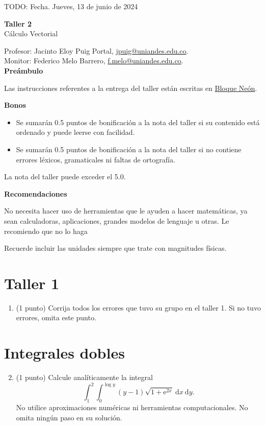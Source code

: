 \documentclass{fmbvecto}
\renewcommand{\title}{Taller 2}
\newcommand{\subject}{Cálculo Vectorial}
\begin{document}
TODO: Fecha. Jueves, 13 de junio de 2024

\begin{center}
    \textbf{\LARGE \title} \\
    {\large \subject}
\end{center}


Profesor: Jacinto Eloy Puig Portal, \href{mailto:jpuig@uniandes.edu.co}{jpuig@uniandes.edu.co}. \\
Monitor: Federico Melo Barrero, \href{mailto:f.melo@uniandes.edu.co}{f.melo@uniandes.edu.co}.\\

\textbf{\Large Preámbulo}

Las instrucciones referentes a la entrega del taller están escritas en \href{https://bloqueneon.uniandes.edu.co/d2l/home}{Bloque Neón}.

\textbf{Bonos}
\begin{itemize}
  \item Se sumarán 0.5 puntos de bonificación a la nota del taller si su contenido está ordenado y puede leerse con facilidad.
  \item Se sumarán 0.5 puntos de bonificación a la nota del taller si no contiene errores léxicos, gramaticales ni faltas de ortografía.
\end{itemize}
La nota del taller puede exceder el 5.0.

\textbf{Recomendaciones}

No necesita hacer uso de herramientas que le ayuden a hacer matemáticas, ya sean calculadoras, aplicaciones, grandes modelos de lenguaje u otras. Le recomiendo que no lo haga

Recuerde incluir las unidades siempre que trate con magnitudes físicas.

\section{Taller 1}

\begin{enumerate}
    \item (1 punto) Corrija todos los errores que tuvo su grupo en el taller 1. Si no tuvo errores, omita este punto.
\end{enumerate}

\section{Integrales dobles}

    \begin{enumerate}
        \setcounter{enumi}{1}
        \item (1 punto) Calcule analíticamente la integral \[ \int_{1}^{2} \int_{0}^{\log y} (y-1) \sqrt{1 + \mathrm{e}^{2x}} \: \mathrm{d}x \: \mathrm{d}y. \] No utilice aproximaciones numéricas ni herramientas computacionales. No omita ningún paso en su solución.
    \end{enumerate}
\end{document}
